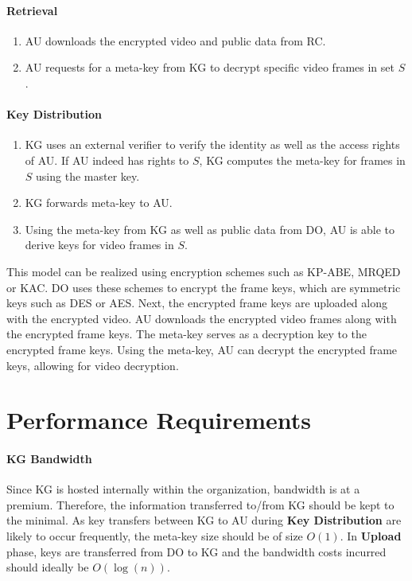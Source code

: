 \documentclass[hyp,a4paper,12pt,openbib]{socreport}
\begin{document}
\paragraph{Retrieval}
\begin{enumerate}
\item AU downloads the encrypted video and public data from RC.

\item AU requests for a meta-key from KG to decrypt specific video frames in set $S$. 
\end{enumerate}

\paragraph{Key Distribution}
\begin{enumerate}
\item KG uses an external verifier to verify the identity as well as the access rights of AU. If AU indeed has rights to $S$, KG computes the meta-key for frames in $S$ using the master key.

\item KG forwards meta-key to AU.

\item Using the meta-key from KG as well as public data from DO, AU is able to derive keys for video frames in $S$. 

\end{enumerate}



This model can be realized using encryption schemes such as KP-ABE, MRQED or KAC. DO uses these schemes to encrypt the frame keys, which are symmetric keys such as DES or AES. Next, the encrypted frame keys are uploaded along with the encrypted video. AU downloads the encrypted video frames along with the encrypted frame keys. The meta-key serves as a decryption key to the encrypted frame keys. Using the meta-key, AU can decrypt the encrypted frame keys, allowing for video decryption. 


\section{Performance Requirements}

\paragraph{KG Bandwidth} Since KG is hosted internally within the organization, bandwidth is at a premium. Therefore, the information transferred to/from KG should be kept to the minimal. As key transfers between KG to AU during \textbf{Key Distribution} are likely to occur frequently, the meta-key size should be of size $O(1)$. In \textbf{Upload} phase, keys are transferred from DO to KG and the bandwidth costs incurred should ideally be $O(\log(n))$.  
\end{document}
